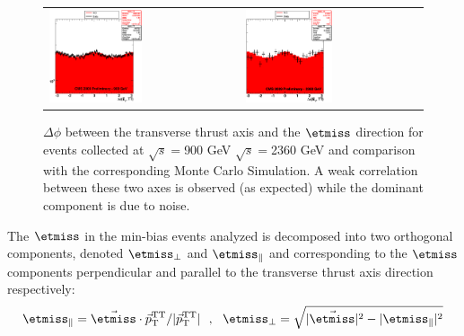 \begin{figure}[h!]
 \centering
 \begin{tabular}{ll}
   \includegraphics[width=0.5\textwidth]{plots_DataVsMC_MB_900GeV/dphi_TT_900.eps}&
    \includegraphics[width=0.5\textwidth]{plots_DataVsMC_MB_2360GeV/dphi_TT_2360.eps}\\
 \end{tabular}
    \caption{$\Delta\phi$ between the transverse thrust axis and the
      $\etmiss$ direction for events collected at $\sqrt{s}=$900 GeV
      $\sqrt{s}=$2360 GeV and comparison with the corresponding Monte
      Carlo Simulation.  A weak correlation between these two axes is
      observed (as expected) while the dominant component is due to
      noise.
      \label{fig:MET-TT}}
\end{figure}

The $\etmiss$ in the min-bias events analyzed is
decomposed into two orthogonal components, denoted $\etmiss_\perp$ and
$\etmiss_\parallel$ and corresponding to the $\etmiss$ components
perpendicular and parallel to the transverse thrust axis direction
respectively:
\begin{equation}
{\rm \etmiss}_{\parallel} = \vec\etmiss\cdot
\vec{p}_\text{T}^\mathrm{TT}/|\vec{p}_\text{T}^\mathrm{TT}|~~,
    ~~ {\rm \etmiss}_{\perp} =
\sqrt{|\vec\etmiss|^{2} -
|\rm{\etmiss}_{\parallel}|^{2}}
\label{eq:U}
\end{equation}

